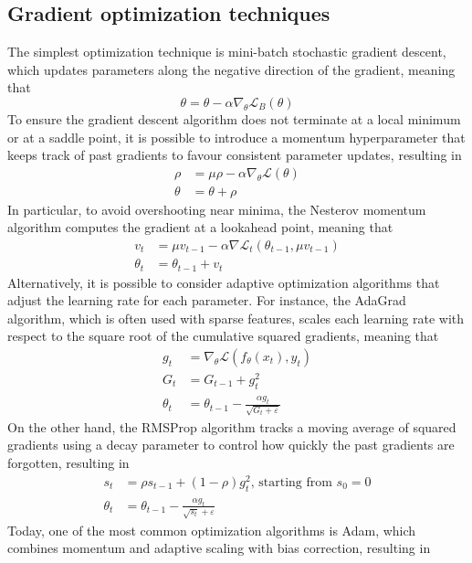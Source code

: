 \documentclass{report}
\begin{document}
\subsection{Gradient optimization techniques}
The simplest optimization technique is mini-batch stochastic gradient descent, which updates parameters along the negative direction of the gradient, meaning that
\[\theta = \theta - \alpha\nabla_{\theta}\mathcal{L}_B(\theta)\]
To ensure the gradient descent algorithm does not terminate at a local minimum or at a saddle point, it is possible to introduce a momentum hyperparameter that keeps track of past gradients to favour consistent parameter updates, resulting in
\begin{align*}
    \rho &= \mu\rho - \alpha\nabla_{\theta}\mathcal{L}(\theta) \\
    \theta &= \theta + \rho
\end{align*}
In particular, to avoid overshooting near minima, the Nesterov momentum algorithm computes the gradient at a lookahead point, meaning that
\begin{align*}
    v_t &= \mu v_{t - 1} - \alpha\nabla\mathcal{L}_t(\theta_{t - 1}, \mu v_{t - 1}) \\
    \theta_t &= \theta_{t - 1} + v_t
\end{align*}
Alternatively, it is possible to consider adaptive optimization algorithms that adjust the learning rate for each parameter. \newline
For instance, the AdaGrad algorithm, which is often used with sparse features, scales each learning rate with respect to the square root of the cumulative squared gradients, meaning that
\begin{align*}
    g_t &= \nabla_{\theta}\mathcal{L}(f_{\theta}(x_t), y_t) \\
    G_t &= G_{t - 1} + g_t^2 \\
    \theta_t &= \theta_{t - 1} - \frac{\alpha g_t}{\sqrt{G_t + \varepsilon}}
\end{align*}
On the other hand, the RMSProp algorithm tracks a moving average of squared gradients using a decay parameter to control how quickly the past gradients are forgotten, resulting in
\begin{align*}
    s_t &= \rho s_{t - 1} + (1 - \rho)g_t^2 \text{, starting from } s_0 = 0 \\
    \theta_t &= \theta_{t - 1} - \frac{\alpha g_t}{\sqrt{s_t} + \varepsilon}
\end{align*}
Today, one of the most common optimization algorithms is Adam, which combines momentum and adaptive scaling with bias correction, resulting in
\end{document}

